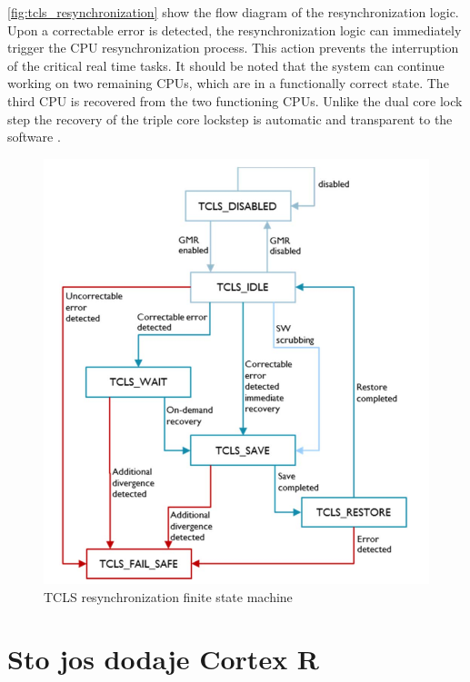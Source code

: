 \autoref{fig:tcls_resynchronization} show the flow diagram of the resynchronization logic. Upon a correctable error is detected, the resynchronization logic can immediately trigger the CPU resynchronization process. This action prevents the interruption of the critical real time tasks. It should be noted that the system can continue working on two remaining CPUs, which are in a functionally correct state. The third CPU is recovered from the two functioning CPUs. Unlike the dual core lock step the recovery of the triple core lockstep is automatic and transparent to the software \citep{TCLS_cortex_r}.

\begin{figure}[H]

      \centering
      \includegraphics[width=0.9\linewidth]{images/tcls_resynchronization.png}
      \caption{TCLS resynchronization finite state machine \citep{TCLS_cortex_r}}
      \label{fig:tcls_resynchronization}
    
\end{figure}

\section{Sto jos dodaje Cortex R}


